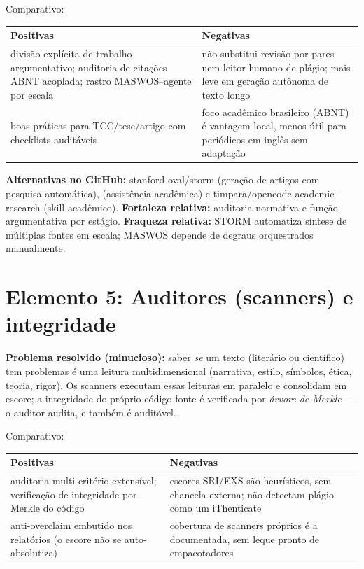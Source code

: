 \begin{resultado}
Comparativo:\par
\smallskip
{\footnotesize
\begin{tabularx}{\linewidth}{YY}
\toprule
Positivas & Negativas \\
\midrule
divisão explícita de trabalho argumentativo; auditoria de citações ABNT acoplada;
rastro MASWOS--agente por escala & não substitui revisão por pares nem leitor
humano de plágio; mais leve em geração autônoma de texto longo \\
boas práticas para TCC/tese/artigo com checklists auditáveis &
foco acadêmico brasileiro (ABNT) é vantagem local, menos útil para periódicos
em inglês sem adaptação \\
\bottomrule
\end{tabularx}\par}
\end{resultado}

\begin{metodo}
\textbf{Alternativas no GitHub:} stanford-oval/storm (geração de artigos com
pesquisa automática),  (assistência acadêmica) e
timpara/opencode-academic-research (skill acadêmico). \textbf{Fortaleza
relativa:} auditoria normativa e função argumentativa por estágio.
\textbf{Fraqueza relativa:} STORM automatiza síntese de múltiplas fontes em
escala; MASWOS depende de degraus orquestrados manualmente.
\end{metodo}

\clearpage
\section{Elemento 5: Auditores (scanners) e integridade}


\begin{funcao}
\textbf{Problema resolvido (minucioso):} saber \emph{se} um texto (literário ou
científico) tem problemas é uma leitura multidimensional (narrativa, estilo,
símbolos, ética, teoria, rigor). Os scanners executam essas leituras em paralelo
e consolidam em escore; a integridade do próprio código-fonte é verificada por
\emph{árvore de Merkle} — o auditor audita, e também é auditável.
\end{funcao}

\begin{resultado}
Comparativo:\par
\smallskip
{\footnotesize
\begin{tabularx}{\linewidth}{YY}
\toprule
Positivas & Negativas \\
\midrule
auditoria multi-critério extensível; verificação de integridade por Merkle do
código & escores SRI/EXS são heurísticos, sem chancela externa; não detectam
plágio como um iThenticate \\
anti-overclaim embutido nos relatórios (o escore não se auto-absolutiza) &
cobertura de scanners próprios é a documentada, sem leque pronto de empacotadores \\
\bottomrule
\end{tabularx}\par}
\end{resultado}

